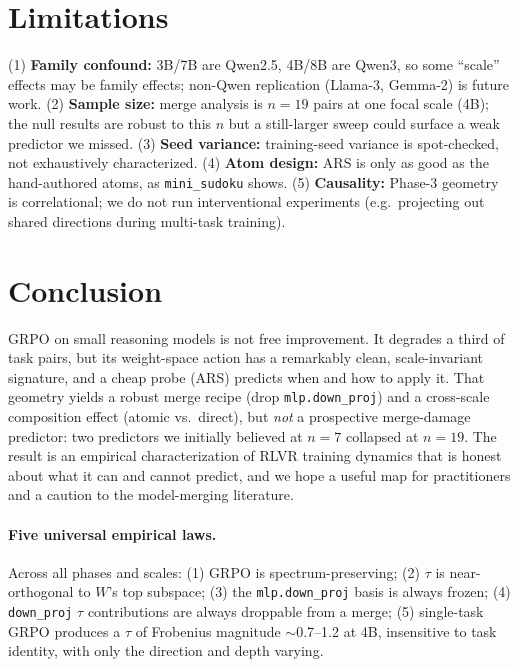 \documentclass{article}
\newcommand{\tv}{\tau}
\begin{document}
\section{Limitations}
(1) \textbf{Family confound:} 3B/7B are Qwen2.5, 4B/8B are Qwen3, so some ``scale'' effects may be
family effects; non-Qwen replication (Llama-3, Gemma-2) is future work. (2) \textbf{Sample size:}
merge analysis is $n{=}19$ pairs at one focal scale (4B); the null results are robust to this $n$
but a still-larger sweep could surface a weak predictor we missed. (3) \textbf{Seed variance:}
training-seed variance is spot-checked, not exhaustively characterized. (4) \textbf{Atom design:}
ARS is only as good as the hand-authored atoms, as \texttt{mini\_sudoku} shows. (5)
\textbf{Causality:} Phase-3 geometry is correlational; we do not run interventional experiments
(e.g.\ projecting out shared directions during multi-task training).

\section{Conclusion}
\label{sec:synthesis}
GRPO on small reasoning models is not free improvement. It degrades a third of task pairs, but
its weight-space action has a remarkably clean, scale-invariant signature, and a cheap probe
(ARS) predicts when and how to apply it. That geometry yields a robust merge recipe (drop
\texttt{mlp.down\_proj}) and a cross-scale composition effect (atomic vs.\ direct), but \emph{not}
a prospective merge-damage predictor: two predictors we initially believed at $n{=}7$ collapsed
at $n{=}19$. The result is an empirical characterization of RLVR training dynamics that is honest
about what it can and cannot predict, and we hope a useful map for practitioners and a caution to
the model-merging literature.

\paragraph{Five universal empirical laws.} Across all phases and scales: (1) GRPO is
spectrum-preserving; (2) $\tv$ is near-orthogonal to $W$'s top subspace; (3) the
\texttt{mlp.down\_proj} basis is always frozen; (4) \texttt{down\_proj} $\tv$ contributions are
always droppable from a merge; (5) single-task GRPO produces a $\tv$ of Frobenius magnitude
$\sim$0.7--1.2 at 4B, insensitive to task identity, with only the direction and depth varying.
\end{document}
